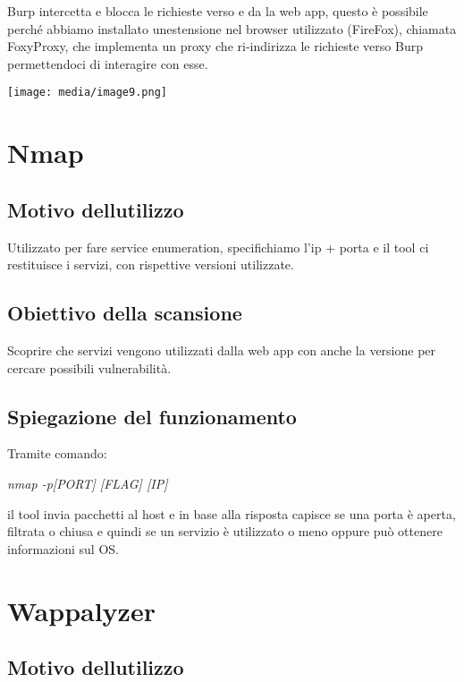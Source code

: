 Burp intercetta e blocca le richieste verso e da la web app, questo è
possibile perché abbiamo installato un\textquotesingle estensione nel
browser utilizzato (FireFox), chiamata FoxyProxy, che implementa un
proxy che ri-indirizza le richieste verso Burp permettendoci di
interagire con esse.

\texttt{[image: media/image9.png]}

\section{Nmap}\label{nmap}

\subsection{Motivo
dell\textquotesingle utilizzo}\label{motivo-dellutilizzo-1}

Utilizzato per fare service enumeration, specifichiamo l'ip + porta e il
tool ci restituisce i servizi, con rispettive versioni utilizzate.

\subsection{Obiettivo della
scansione}\label{obiettivo-della-scansione-1}

Scoprire che servizi vengono utilizzati dalla web app con anche la
versione per cercare possibili vulnerabilità.

\subsection{Spiegazione del
funzionamento}\label{spiegazione-del-funzionamento-1}

Tramite comando:

\emph{nmap -p{[}PORT{]} {[}FLAG{]} {[}IP{]}}

il tool invia pacchetti al host e in base alla risposta capisce se una
porta è aperta, filtrata o chiusa e quindi se un servizio è utilizzato o
meno oppure può ottenere informazioni sul OS.

\section{Wappalyzer}\label{wappalyzer}

\subsection{Motivo
dell\textquotesingle utilizzo}\label{motivo-dellutilizzo-2}

